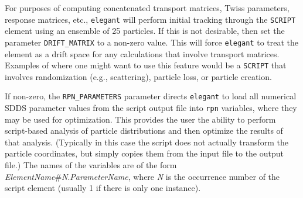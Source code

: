 For purposes of computing concatenated transport matrices, Twiss
parameters, response matrices, etc., {\tt elegant} will perform
initial tracking through the \verb|SCRIPT| element using an ensemble
of 25 particles.  If this is not desirable, then set the parameter
\verb|DRIFT_MATRIX| to a non-zero value.  This will force
\verb|elegant| to treat the element as a drift space for any
calculations that involve transport matrices.  Examples of where one
might want to use this feature would be a \verb|SCRIPT| that involves
randomization (e.g., scattering), particle loss, or particle creation.

If non-zero, the \verb|RPN_PARAMETERS| parameter directs \verb|elegant| to load all numerical
SDDS parameter values from the script output file into \verb|rpn| variables, where they may be used for
optimization. This provides the user the ability to perform script-based analysis of particle distributions and
then optimize the results of that analysis.
(Typically in this case the script does not actually transform the particle coordinates, but simply copies them
from the input file to the output file.)
The names of the variables are of the form {\em ElementName}\#{\em N}.{\em ParameterName}, where
{\em N} is the occurrence number of the script element (usually 1 if there is only one instance).

